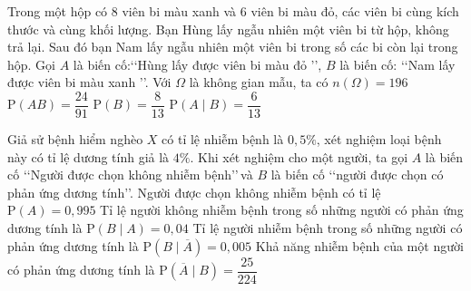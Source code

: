 \begin{ex}%
	Trong một hộp có $8$ viên bi màu xanh và $6$ viên bi màu đỏ, các viên bi cùng kích thước và cùng khối lượng. Bạn Hùng lấy ngẫu nhiên một viên bi từ hộp, không trả lại. Sau đó bạn Nam lấy ngẫu nhiên một viên bi trong số các bi còn lại trong hộp. Gọi $A$ là biến cố:\lq\lq Hùng lấy được viên bi màu đỏ \rq\rq, $B$ là biến cố: \lq\lq Nam lấy được viên bi màu  xanh \rq\rq.
	 \choiceTF
		{Với $\Omega$  là không gian mẫu, ta có $n(\Omega)=196$}
		{\True $\mathrm{P}(AB)=\dfrac{24}{91}$} 
		{$\mathrm{P}(B)=\dfrac{8}{13}$} 
		{\True $\mathrm{P}(A \mid  B)=\dfrac{6}{13}$}
\end{ex}

\begin{ex}%
	Giả sử bệnh hiểm nghèo $X$ có tỉ lệ nhiễm bệnh là $0{,}5\%$, xét nghiệm loại bệnh này có  tỉ lệ dương tính giả là $4\%$. Khi xét nghiệm cho một người, ta gọi $A$ là biến cố \lq\lq Người được chọn không nhiễm bệnh\rq\rq\,và $B$ là biến cố \lq\lq người được chọn có phản ứng dương tính\rq\rq.
	 \choiceTF
		{\True Người được chọn không  nhiễm bệnh có tỉ lệ $\mathrm{P}(A)=0{,}995$}
		{\True Tỉ lệ người không nhiễm bệnh trong số những người có phản ứng dương tính  là $\mathrm{P}(B \mid A)=0{,}04$}
		{Tỉ lệ người nhiễm bệnh trong số những người có phản ứng dương tính là  $\mathrm{P}\left(B\mid \overline{A}\right)=0{,}005$}
		 {\True Khả năng nhiễm bệnh của một người có phản ứng dương tính là $\mathrm{P}\left(\overline{A} \mid B\right)=\dfrac{25}{224}$}
\end{ex}

